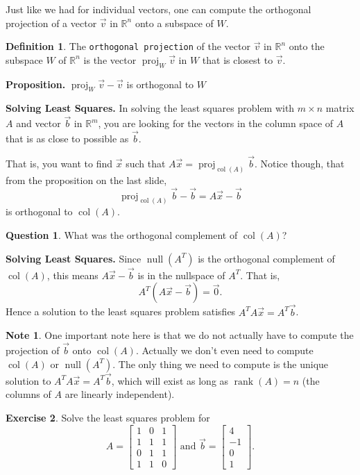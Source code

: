 \documentclass{beamer}
\newcommand{\R}{\mathbb{R}}
\newcommand{\fn}{\insertframenumber}
\newcommand{\col}{\operatorname{col}}
\newcommand{\rank}{\operatorname{rank}}
\newcommand{\proj}{\operatorname{proj}}
\newcommand{\ns}{\operatorname{null}}
\theoremstyle{definition}
\newtheorem{exercise}{Exercise}
\newtheorem{question}[exercise]{Question}
\newtheorem*{defn}{Definition}
\newtheorem*{nb}{Note}
\renewcommand{\emph}[1]{{\color{blue}\texttt{#1}}}
\begin{document}
\begin{frame}{\fn}
	Just like we had for individual vectors, one can compute the orthogonal projection of a vector $\vec v$ in $\R^n$ onto a subspace of $W$. 
	\begin{defn}
		The \emph{orthogonal projection} of the vector $\vec v$ in $\R^n$ onto the subspace $W$ of $\R^n$ is the vector $\proj_W \vec v$ in $W$ that is closest to $\vec v$.
	\end{defn}
	\begin{block}{\textbf{Proposition.}}
		$\proj_W\vec v-\vec v$ is orthogonal to $W$
	\end{block}
\end{frame}
\begin{frame}{\fn}
	\begin{block}{\textbf{Solving Least Squares.}}
		In solving the least squares problem with $m\times n$ matrix $A$ and vector $\vec b$ in $\R^m$, you are looking for the vectors in the column space of $A$ that is as close to possible as $\vec b$.
		
		That is, you want to find $\vec x$ such that $A\vec x=\proj_{\col(A)}\vec b$.  Notice though, that from the proposition on the last slide,
			\[\proj_{\col(A)}\vec b-\vec b=A\vec x-\vec b\]
		is orthogonal to $\col(A)$.
	\end{block}
	\begin{question}
		What was the orthogonal complement of $\col(A)$?
	\end{question}
\end{frame}
\begin{frame}{\fn}
	\begin{block}{\textbf{Solving Least Squares.}}
		Since $\ns(A^T)$ is the orthogonal complement of $\col(A)$, this means $A\vec x-\vec b$ is in the nullspace of $A^T$.  That is,
			\[A^T(A\vec x-\vec b)=\vec 0.\]
		Hence a solution to the least squares problem satisfies $A^TA\vec x=A^T\vec b$.
	\end{block}
	\begin{nb}
		One important note here is that we do not actually have to compute the projection of $\vec b$ onto $\col(A)$.  Actually we don't even need to compute $\col(A)$ or $\ns(A^T)$. The only thing we need to compute is the unique solution to $A^TA\vec x=A^T\vec b$, which will exist as long as $\rank(A)=n$ (the columns of $A$ are linearly independent).
	\end{nb}
\end{frame}
\begin{frame}{\fn}
	\begin{exercise}
		Solve the least squares problem for \[A=\begin{bmatrix}1&0&1\\1&1&1\\0&1&1\\1&1&0\end{bmatrix}\text{ and }\vec b=\begin{bmatrix}4\\-1\\0\\1\end{bmatrix}.\]
	\end{exercise}
\end{frame}
\end{document}
